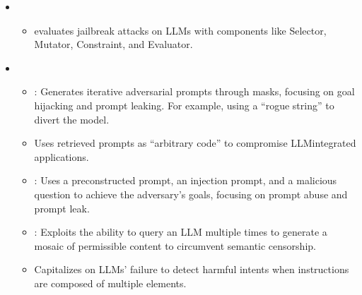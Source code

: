 \documentclass[letterpaper,11pt,english]{sphinxmanual}
\begin{document}
\begin{itemize}
\begin{itemize}
\end{itemize}

\item {} 
\sphinxAtStartPar
{}
\begin{itemize}
\item {} 
\sphinxAtStartPar
{} evaluates jailbreak attacks on LLMs with
components like Selector, Mutator, Constraint, and Evaluator.

\end{itemize}

\item {} 
\sphinxAtStartPar
{}
\begin{itemize}
\item {} 
\sphinxAtStartPar
{}: Generates iterative adversarial prompts through
masks, focusing on goal hijacking and prompt leaking. For example,
using a “rogue string” to divert the model.

\item {} 
\sphinxAtStartPar
{} Uses retrieved prompts as
“arbitrary code” to compromise LLM\sphinxhyphen{}integrated applications.

\item {} 
\sphinxAtStartPar
{}: Uses a preconstructed prompt, an injection prompt, and a
malicious question to achieve the adversary’s goals, focusing on
prompt abuse and prompt leak.

\item {} 
\sphinxAtStartPar
{}: Exploits the ability to query an LLM multiple
times to generate a mosaic of permissible content to circumvent
semantic censorship.

\item {} 
\sphinxAtStartPar
{} Capitalizes on LLMs’
failure to detect harmful intents when instructions are composed of
multiple elements.

\end{itemize}

\end{itemize}
\end{document}
